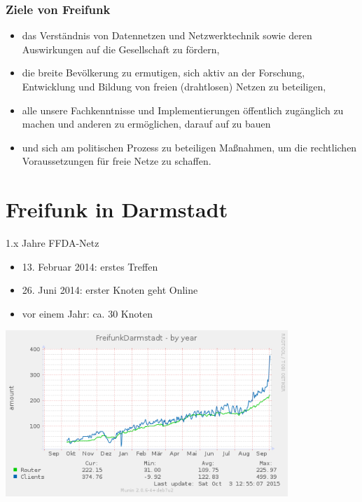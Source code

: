 \documentclass[handout, 10pt]{beamer}
\begin{document}
\begin{frame}
	\frametitle{Ziele von Freifunk}
	\begin{itemize}[<+->]
		\item das Verständnis von Datennetzen und Netzwerktechnik sowie deren Auswirkungen auf die Gesellschaft zu fördern,
		\item die breite Bevölkerung zu ermutigen, sich aktiv an der Forschung, Entwicklung und Bildung von freien (drahtlosen) Netzen zu beteiligen,
		\item 	alle unsere Fachkenntnisse und Implementierungen öffentlich zugänglich zu machen und anderen zu ermöglichen, darauf auf zu bauen
		\item und sich am politischen Prozess zu beteiligen Maßnahmen, um die rechtlichen Voraussetzungen für freie Netze zu schaffen.
	\end{itemize}
\end{frame}


\section{Freifunk in Darmstadt}




\begin{frame}{1.x Jahre FFDA-Netz}
	\vfill
	\begin{itemize}[<+->]
		\item 13. Februar 2014: erstes Treffen
		\item 26. Juni 2014: erster Knoten geht Online
		\item vor einem Jahr: ca. 30 Knoten
	\end{itemize}
	\pause
	\begin{center}
		\includegraphics[width=0.8\textwidth]{images/ffda-Okt14-15}
	\end{center}
\end{frame}
\end{document}
